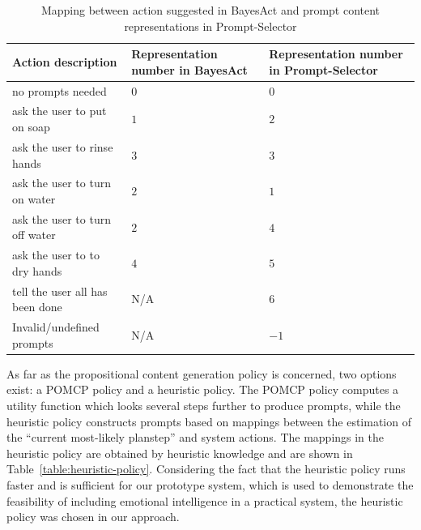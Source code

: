 %
\begin{table}
\centering
\caption{Mapping between action suggested in BayesAct and prompt content representations in Prompt-Selector}
\label{table:prompt-number-def}
\begin{tabular}{| l | p{5cm} | p{5cm} |}
\hline
Action description & Representation number in BayesAct & Representation number in Prompt-Selector \\ \hline
no prompts needed & 0 & 0\\ \hline
ask the user to put on soap & $1$ & $2$ \\ \hline
ask the user to rinse hands & $3$ & $3$ \\ \hline
ask the user to turn on water & $2$ & $1$ \\ \hline
ask the user to turn off water & $2$ & $4$ \\ \hline
ask the user to to dry hands & $4$ & $5$ \\ \hline
tell the user all has been done & N/A & $6$ \\ \hline
Invalid/undefined prompts & N/A &$-1$ \\ \hline
\end{tabular}
\end{table}

As far as the propositional content generation policy is concerned, two options exist: a POMCP policy and a heuristic policy. The POMCP policy computes a utility function which looks several steps further to produce prompts, while the heuristic policy constructs prompts based on mappings between the estimation of the ``current most-likely  planstep'' and system actions. The mappings in the heuristic policy are obtained by heuristic knowledge and are shown in Table~\ref{table:heuristic-policy}. Considering the fact that the heuristic policy runs faster and is sufficient for our prototype system, which is used to demonstrate the feasibility of including emotional intelligence in a practical system, the heuristic policy was chosen in our approach.

